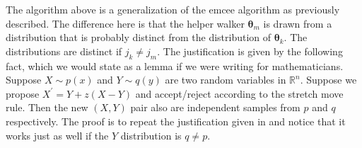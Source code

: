 \documentclass[letterpaper, preprint]{aastex}
\newcommand{\bth} {\boldsymbol \theta}
\begin{document}
The algorithm above is a generalization of the emcee algorithm as previously described.
The difference here is that the helper walker $\bth_m$ is drawn from a distribution that is 
probably distinct from the distribution of $\bth_k$.
The distributions are distinct if $j_k \neq j_m$.
The justification is given by the following fact, which we would state as a lemma if we were writing
for mathematicians.
Suppose $X \sim p(x)$ and $Y \sim q(y)$ are two random variables in ${\mathbb R}^n$.
Suppose we propose $X^{\prime} = Y + z(X-Y)$ and accept/reject according to the stretch move rule.
Then the new $(X,Y)$ pair also are independent samples from $p$ and $q$ respectively.
The proof is to repeat the justification given in \cite{GW} and notice that it works just as well
if the $Y$ distribution is $q \neq p$.
\end{document}
